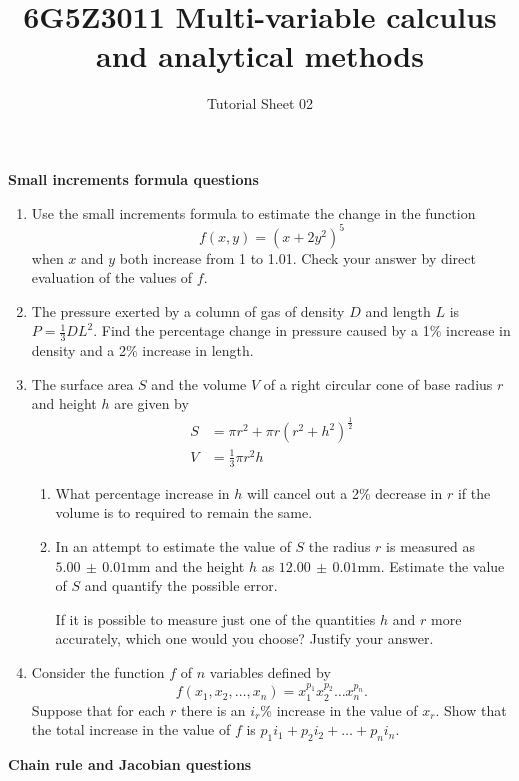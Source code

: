\documentclass[20pt, a4paper]{extarticle}
\begin{document}
\title{6G5Z3011 Multi-variable calculus and analytical methods}
\author{Tutorial Sheet 02}
\maketitle

\textbf{Small increments formula questions}
\begin{enumerate}

\item
Use the small increments formula to estimate the change in the function
$$f(x,y)=\left ( x+2y^2 \right )^5$$
when $x$ and $y$ both increase from 1 to 1.01. Check your answer by direct evaluation of the values of $f$.
\item
The pressure exerted by a column of gas of density $D$ and length $L$ is $P=\frac{1}{3} DL^2$. Find the percentage change in pressure caused by a 1\% increase in density and a 2\% increase in length.
\item
The surface area $S$ and the volume $V$ of a right circular cone of base radius $r$ and height $h$ are given by 
\begin{align*}
S&=\pi r^2 + \pi r \left ( r^2 + h^2 \right )^{\frac{1}{2}} \\
V&=\frac{1}{3} \pi r^2 h
\end{align*}
\begin{enumerate}
\item
What percentage increase in $h$ will cancel out a 2\% decrease in $r$ if the volume is to required to remain the same. 
\item
In an attempt to estimate the value of $S$ the radius $r$ is measured as $5.00 \, \pm \, 0.01 \text{mm}$ and the height $h$ as  $12.00 \, \pm \, 0.01 \text{mm}$. Estimate the value of $S$ and quantify the possible error.

If it is possible to measure just one of the quantities $h$ and $r$ more accurately, which one would you choose? Justify your answer.
\end{enumerate}
\item
Consider the function $f$ of $n$ variables defined by
$$f(x_1,x_2, \dots , x_n) = x_1^{p_1} x_2^{p_2} \dots x_n^{p_n} .$$
Suppose that for each $r$ there is an $i_r$\% increase in the value of $x_r$. Show that the total increase in the value of $f$ is $p_1 i_1 + p_2 i_2 + \dots + p_n i_n$.

\end{enumerate}
\textbf{Chain rule and Jacobian questions}
\end{document}

